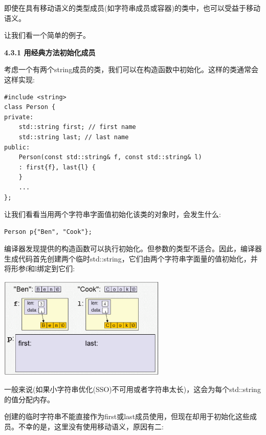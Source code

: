 即使在具有移动语义的类型成员(如字符串成员或容器)的类中，也可以受益于移动语义。\par

让我们看一个简单的例子。\par

\hspace*{\fill} \par %
\textbf{4.3.1 用经典方法初始化成员}

考虑一个有两个string成员的类，我们可以在构造函数中初始化。这样的类通常会这样实现:\par

{\color{red}{basics/customer.hpp}}

\begin{lstlisting}[caption={}]
#include <string>
class Person {
private:
	std::string first; // first name
	std::string last; // last name
public:
	Person(const std::string& f, const std::string& l)
	: first{f}, last{l} {
	}
	...
};
\end{lstlisting}

让我们看看当用两个字符串字面值初始化该类的对象时，会发生什么:\par

\begin{lstlisting}[caption={}]
Person p{"Ben", "Cook"};
\end{lstlisting}

编译器发现提供的构造函数可以执行初始化。但参数的类型不适合。因此，编译器生成代码首先创建两个临时std::string，它们由两个字符串字面量的值初始化，并将形参f和l绑定到它们:\par

\begin{center}
	\includegraphics[width=0.6\textwidth]{content/1/chapter4/images/1}
\end{center}

一般来说(如果小字符串优化(SSO)不可用或者字符串太长)，这会为每个std::string的值分配内存。\par

创建的临时字符串不能直接作为first或last成员使用，但现在却用于初始化这些成员。不幸的是，这里没有使用移动语义，原因有二:\par

